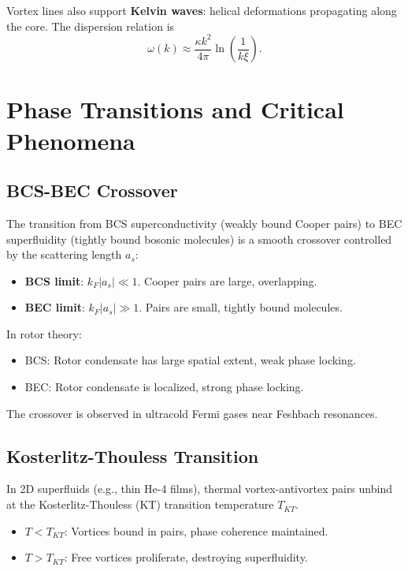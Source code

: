 \documentclass[12pt,a4paper]{article}
\theoremstyle{definition}
\theoremstyle{remark}
\begin{document}
Vortex lines also support \textbf{Kelvin waves}: helical deformations propagating along the core. The dispersion relation is
\begin{equation}
\omega(k) \approx \frac{\kappa k^2}{4\pi} \ln\left(\frac{1}{k\xi}\right).
\end{equation}

\section{Phase Transitions and Critical Phenomena}

\subsection{BCS-BEC Crossover}

The transition from BCS superconductivity (weakly bound Cooper pairs) to BEC superfluidity (tightly bound bosonic molecules) is a smooth crossover controlled by the scattering length $a_s$:

\begin{itemize}
\item \textbf{BCS limit}: $k_F |a_s| \ll 1$. Cooper pairs are large, overlapping.
\item \textbf{BEC limit}: $k_F |a_s| \gg 1$. Pairs are small, tightly bound molecules.
\end{itemize}

In rotor theory:
\begin{itemize}
\item BCS: Rotor condensate has large spatial extent, weak phase locking.
\item BEC: Rotor condensate is localized, strong phase locking.
\end{itemize}

The crossover is observed in ultracold Fermi gases near Feshbach resonances.

\subsection{Kosterlitz-Thouless Transition}

In 2D superfluids (e.g., thin He-4 films), thermal vortex-antivortex pairs unbind at the Kosterlitz-Thouless (KT) transition temperature $T_{KT}$.

\begin{itemize}
\item $T < T_{KT}$: Vortices bound in pairs, phase coherence maintained.
\item $T > T_{KT}$: Free vortices proliferate, destroying superfluidity.
\end{itemize}
\end{document}
